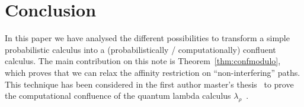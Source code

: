 \section{Conclusion}
In this paper we have analysed the different possibilities to transform a simple probabilistic calculus into a (probabilistically / computationally) confluent calculus. The main contribution on this note is Theorem~\ref{thm:confmodulo}, which proves that we can relax the affinity restriction on ``non-interfering'' paths. This technique has been considered in the first author master's thesis~\cite{Romero20} to prove the computational confluence of the quantum lambda calculus $\lambda_\rho$~\cite{lambdarho}.

